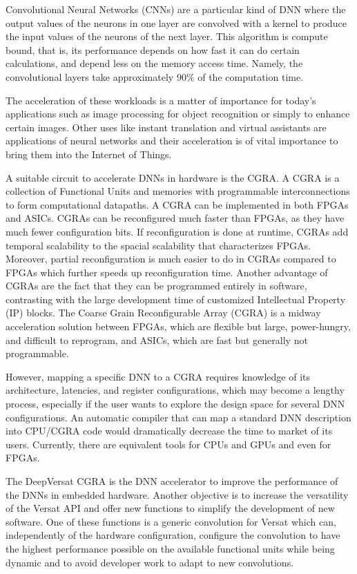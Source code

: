 \documentclass[conference]{IEEEtran}
\begin{document}
Convolutional Neural Networks (CNNs) are a particular kind of DNN where the output
values of the neurons in one layer are convolved with a kernel to produce the
input values of the neurons of the next layer. This algorithm is compute bound,
that is, its performance depends on how fast it can do certain calculations, and
depend less on the memory access time. Namely, the convolutional layers take
approximately 90$\%$ of the computation time.

The acceleration of these workloads is a matter of importance for today's
applications such as image processing for object recognition or simply to
enhance certain images. Other uses like instant translation and virtual
assistants are applications of neural networks and their acceleration is of
vital importance to bring them into the Internet of Things.

A suitable circuit to accelerate DNNs in hardware is the CGRA. A CGRA is a
collection of Functional Units and memories with programmable interconnections
to form computational datapaths. A CGRA can be implemented in both
FPGAs and ASICs. CGRAs can be reconfigured much faster than FPGAs, as they have
much fewer configuration bits. If reconfiguration is done at runtime, CGRAs add
temporal scalability to the spacial scalability that characterizes
FPGAs. Moreover, partial reconfiguration is much easier to do in CGRAs compared
to FPGAs which further speeds up reconfiguration time. Another advantage of
CGRAs are the fact that they can be programmed entirely in software, contrasting
with the large development time of customized Intellectual Property (IP) blocks.
The Coarse Grain Reconfigurable Array (CGRA) is a midway acceleration solution
between FPGAs, which are flexible but large, power-hungry, and difficult to
reprogram, and ASICs, which are fast but generally not programmable.

However, mapping a specific DNN to a CGRA requires knowledge of its
architecture, latencies, and register configurations, which may become a lengthy
process, especially if the user wants to explore the design space for several
DNN configurations. An automatic compiler that can map a standard DNN
description into CPU/CGRA code would dramatically decrease the time to market of its
users. Currently, there are equivalent tools for CPUs and GPUs and
even for FPGAs.

The DeepVersat CGRA is the DNN accelerator to improve the performance of the DNNs in embedded hardware.
Another objective is to increase the versatility of the Versat API and offer new functions
to simplify the development of new software. One of these functions is a generic convolution for
Versat which can, independently of the hardware configuration, configure the convolution to have
the highest performance possible on the available functional units while being dynamic and
to avoid developer work to adapt to new convolutions.
\end{document}
